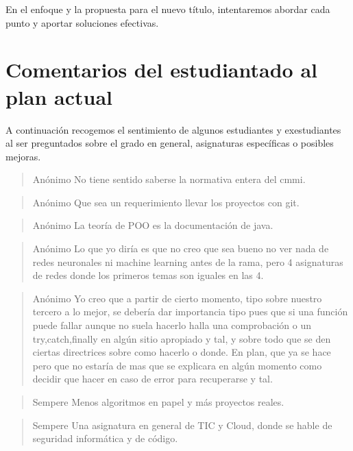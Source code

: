 En el enfoque y la propuesta para el nuevo título,
intentaremos abordar cada punto y aportar soluciones efectivas.

\section{Comentarios del estudiantado al plan actual}
A continuación recogemos el sentimiento de algunos estudiantes y exestudiantes 
al ser preguntados sobre el grado en general, asignaturas específicas o posibles
mejoras.

\begin{quote}{Anónimo}
    No tiene sentido saberse la normativa entera del cmmi.
\end{quote}

\begin{quote}{Anónimo}
    Que sea un requerimiento llevar los proyectos con git.
\end{quote}

\begin{quote}{Anónimo}
    La teoría de POO es la documentación de java.
\end{quote}

\begin{quote}{Anónimo}
    Lo que yo diría es que no creo que sea bueno
    no ver nada de redes neuronales ni machine learning antes de la rama,
    pero 4 asignaturas de redes donde los primeros temas son iguales en las 4.
\end{quote}

\begin{quote}{Anónimo}
    Yo creo que a partir de cierto momento,
    tipo sobre nuestro tercero a lo mejor,
    se debería dar importancia tipo pues que
    si una función puede fallar aunque no suela hacerlo
    halla una comprobación o un try,catch,finally en algún sitio apropiado y tal,
    y sobre todo que se den ciertas directrices sobre como hacerlo o donde.
    En plan, que ya se hace pero que no estaría de mas que
    se explicara en algún momento como decidir que hacer en caso de error
    para recuperarse y tal.
\end{quote}

\begin{quote}{Sempere}
    Menos algoritmos en papel y más proyectos reales.
\end{quote}

\begin{quote}{Sempere}
    Una asignatura en general de TIC y Cloud,
    donde se hable de seguridad informática y de código.
\end{quote}

